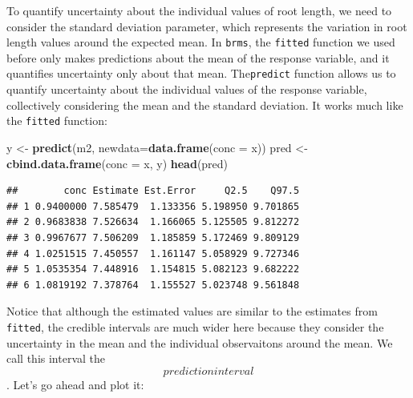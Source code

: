 \documentclass[
]{book}
\newenvironment{Shaded}{\begin{snugshade}}{\end{snugshade}}
\newcommand{\AttributeTok}[1]{\textcolor[rgb]{0.13,0.29,0.53}{#1}}
\newcommand{\FunctionTok}[1]{\textcolor[rgb]{0.13,0.29,0.53}{\textbf{#1}}}
\newcommand{\NormalTok}[1]{#1}
\newcommand{\OtherTok}[1]{\textcolor[rgb]{0.56,0.35,0.01}{#1}}
\begin{document}
To quantify uncertainty about the individual values of root length, we need to consider the standard deviation parameter, which represents the variation in root length values around the expected mean. In \texttt{brms}, the \texttt{fitted} function we used before only makes predictions about the mean of the response variable, and it quantifies uncertainty only about that mean. The\texttt{predict} function allows us to quantify uncertainty about the individual values of the response variable, collectively considering the mean and the standard deviation. It works much like the \texttt{fitted} function:

\begin{Shaded}
\begin{Highlighting}[]
\NormalTok{y }\OtherTok{\textless{}{-}} \FunctionTok{predict}\NormalTok{(m2, }\AttributeTok{newdata=}\FunctionTok{data.frame}\NormalTok{(}\AttributeTok{conc =}\NormalTok{ x))}
\NormalTok{pred }\OtherTok{\textless{}{-}} \FunctionTok{cbind.data.frame}\NormalTok{(}\AttributeTok{conc =}\NormalTok{ x, y)}
\FunctionTok{head}\NormalTok{(pred)}
\end{Highlighting}
\end{Shaded}

\begin{verbatim}
##        conc Estimate Est.Error     Q2.5    Q97.5
## 1 0.9400000 7.585479  1.133356 5.198950 9.701865
## 2 0.9683838 7.526634  1.166065 5.125505 9.812272
## 3 0.9967677 7.506209  1.185859 5.172469 9.809129
## 4 1.0251515 7.450557  1.161147 5.058929 9.727346
## 5 1.0535354 7.448916  1.154815 5.082123 9.682222
## 6 1.0819192 7.378764  1.155527 5.023748 9.561848
\end{verbatim}

Notice that although the estimated values are similar to the estimates from \texttt{fitted}, the credible intervals are much wider here because they consider the uncertainty in the mean and the individual observaitons around the mean. We call this interval the \[prediction interval\]. Let's go ahead and plot it:
\end{document}
